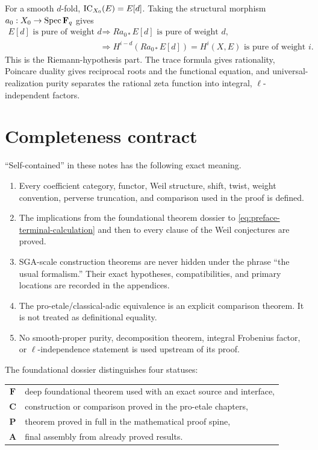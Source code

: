 For a smooth \(d\)-fold,
\(\operatorname{IC}_{X_0}(E)=E[d]\).  Taking the structural morphism
\(a_0:X_0\to\operatorname{Spec}\mathbf F_q\) gives
\[
\begin{aligned}
 E[d]\text{ is pure of weight }d
 &\Longrightarrow Ra_{0*}E[d]\text{ is pure of weight }d,\\
 &\Longrightarrow
 H^{i-d}(Ra_{0*}E[d])
   =H^i(X,E)\text{ is pure of weight }i.
\end{aligned}
\tag{P.8}\label{eq:preface-terminal-calculation}
\]
This is the Riemann-hypothesis part.  The trace formula gives rationality,
Poincare duality gives reciprocal roots and the functional equation, and
universal-realization purity separates the rational zeta function into
integral, \(\ell\)-independent factors.

\section*{Completeness contract}

“Self-contained” in these notes has the following exact meaning.

\begin{enumerate}
\item Every coefficient category, functor, Weil structure, shift, twist,
      weight convention, perverse truncation, and comparison used in the
      proof is defined.
\item The implications from the foundational theorem dossier to
      \eqref{eq:preface-terminal-calculation} and then to every clause of the
      Weil conjectures are proved.
\item SGA-scale construction theorems are never hidden under the phrase
      “the usual formalism.”  Their exact hypotheses, compatibilities, and
      primary locations are recorded in the appendices.
\item The pro-etale/classical-adic equivalence is an explicit comparison
      theorem.  It is not treated as definitional equality.
\item No smooth-proper purity, decomposition theorem, integral Frobenius
      factor, or \(\ell\)-independence statement is used upstream of its
      proof.
\end{enumerate}

The foundational dossier distinguishes four statuses:

\begin{center}
\begin{tabular}{cl}
\toprule
\(\mathbf F\) & deep foundational theorem used with an exact source and
                interface,\\
\(\mathbf C\) & construction or comparison proved in the pro-etale chapters,\\
\(\mathbf P\) & theorem proved in full in the mathematical proof spine,\\
\(\mathbf A\) & final assembly from already proved results.\\
\bottomrule
\end{tabular}
\end{center}

